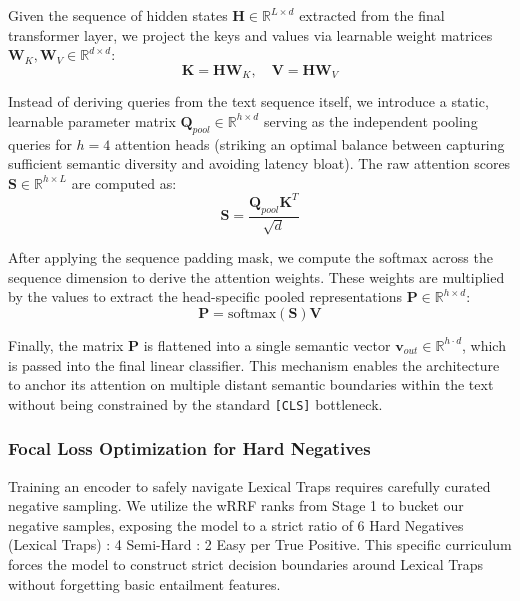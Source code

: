 \documentclass[sigconf]{acmart}
\begin{document}
Given the sequence of hidden states $\mathbf{H} \in \mathbb{R}^{L \times d}$ extracted from the final transformer layer, we project the keys and values via learnable weight matrices $\mathbf{W}_K, \mathbf{W}_V \in \mathbb{R}^{d \times d}$:
\begin{equation}
    \mathbf{K} = \mathbf{H}\mathbf{W}_K, \quad \mathbf{V} = \mathbf{H}\mathbf{W}_V
\end{equation}

Instead of deriving queries from the text sequence itself, we introduce a static, learnable parameter matrix $\mathbf{Q}_{pool} \in \mathbb{R}^{h \times d}$ serving as the independent pooling queries for $h=4$ attention heads (striking an optimal balance between capturing sufficient semantic diversity and avoiding latency bloat). The raw attention scores $\mathbf{S} \in \mathbb{R}^{h \times L}$ are computed as:
\begin{equation}
    \mathbf{S} = \frac{\mathbf{Q}_{pool} \mathbf{K}^T}{\sqrt{d}}
\end{equation}

After applying the sequence padding mask, we compute the softmax across the sequence dimension to derive the attention weights. These weights are multiplied by the values to extract the head-specific pooled representations $\mathbf{P} \in \mathbb{R}^{h \times d}$:
\begin{equation}
    \mathbf{P} = \text{softmax}(\mathbf{S})\mathbf{V}
\end{equation}

Finally, the matrix $\mathbf{P}$ is flattened into a single semantic vector $\mathbf{v}_{out} \in \mathbb{R}^{h \cdot d}$, which is passed into the final linear classifier. This mechanism enables the architecture to anchor its attention on multiple distant semantic boundaries within the text without being constrained by the standard \texttt{[CLS]} bottleneck.

\subsubsection{Focal Loss Optimization for Hard Negatives}
Training an encoder to safely navigate Lexical Traps requires carefully curated negative sampling. We utilize the wRRF ranks from Stage 1 to bucket our negative samples, exposing the model to a strict ratio of 6 Hard Negatives (Lexical Traps) : 4 Semi-Hard : 2 Easy per True Positive. This specific curriculum forces the model to construct strict decision boundaries around Lexical Traps without forgetting basic entailment features. 
\end{document}
